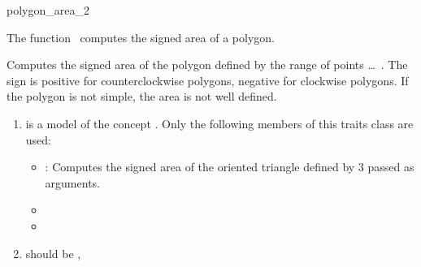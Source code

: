 

\begin{ccRefFunction}{polygon_area_2}  %


\ccDefinition
  
The function \ccRefName\ computes the signed area of a polygon.


{
Computes the signed area of the polygon defined by the range of points
 \ldots\ .
The sign is positive for counterclockwise polygons, negative for
clockwise polygons. If the polygon is not simple, the area is not well defined.
}

\begin{enumerate}
    \item {} is a model of the concept 
	  .
	  Only the following members of this traits class are used:
          \begin{itemize}
	    \item {} : Computes the signed area of the
	    oriented triangle defined by 3  passed as arguments.
            \item {}
            \item {}
          \end{itemize}
    \item {} should be ,
\end{enumerate}

\ccSeeAlso

 \\
 \\
 \\


\end{ccRefFunction}


